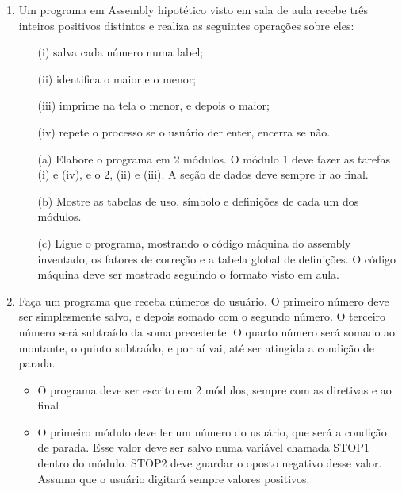 \begin{enumerate}
    \item
    Um programa em Assembly hipotético visto em sala de aula 
    recebe três inteiros positivos distintos 
    e realiza as seguintes operações sobre eles:
    \begin{itemize}
        \item [(i)] salva cada número numa label;
        \item [(ii)] identifica o maior e o menor;
        \item [(iii)] imprime na tela o menor, e depois o maior;
        \item [(iv)] repete o processo se o usuário der enter, encerra se não.
    \end{itemize}

    \begin{itemize}
        \item [(a)]
        Elabore o programa em 2 módulos.
        O módulo 1 deve fazer as tarefas (i) e (iv), 
        e o 2, (ii) e (iii).
        A seção de dados deve sempre ir ao final.

        \item [(b)]
        Mostre as tabelas de uso, símbolo
        e definições de cada um dos módulos.

        \item [(c)]
        Ligue o programa, mostrando 
        o código máquina do assembly inventado,
        os fatores de correção 
        e a tabela global de definições.
        O código máquina deve ser mostrado 
        seguindo o formato visto em aula.
    \end{itemize}

    \item
    Faça um programa que receba números do usuário.
    O primeiro número deve ser simplesmente salvo,
    e depois somado com o segundo número.
    O terceiro número será subtraído da soma precedente.
    O quarto número será somado ao montante,
    o quinto subtraído, e por aí vai, até ser atingida a condição de parada.
    \begin{itemize}
        \item
        O programa deve ser escrito em 2 módulos, 
        sempre com as diretivas  e  ao final

        \item
        O primeiro módulo deve ler um número do usuário, que será a condição de parada.
        Esse valor deve ser salvo numa variável chamada STOP1 dentro do módulo.
        STOP2 deve guardar o oposto negativo desse valor.
        Assuma que o usuário digitará sempre valores positivos.


\end{itemize}
\end{enumerate}
